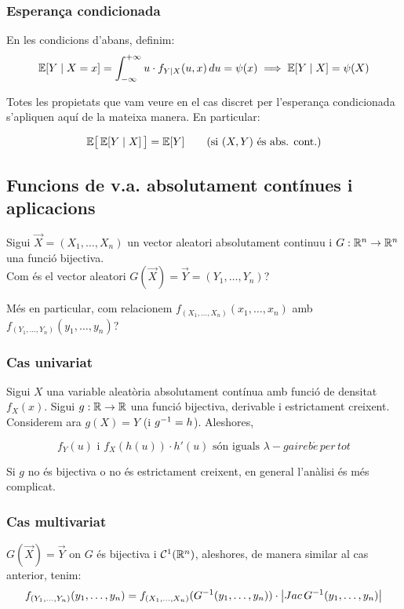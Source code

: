 \subsubsection{Esperança condicionada}

En les condicions d'abans, definim:
\[
  \mathbb{E}[Y\mid X=x] = \int_{-\infty}^{+\infty}u\cdot f_{Y\mid X}(u,x)\, du = \psi(x) \implies \mathbb{E}[Y\mid X] = \psi(X)
\]

Totes les propietats que vam veure en el cas discret per l'esperança condicionada s'apliquen aquí de la 
mateixa manera. En particular:

\begin{prop}
  \[
    \mathbb{E}\big[\,\mathbb{E}[Y\mid X]\,\big] = \mathbb{E}[Y] \qquad \text{(si $(X,Y)$ és abs. cont.)}
  \]
\end{prop}

\subsection{Funcions de v.a. absolutament contínues i aplicacions}

Sigui $\overrightarrow{X} = (X_{1}, \ldots , X_{n})$ un vector aleatori absolutament 
continuu i $G:\mathbb{R}^{n} \to \mathbb{R}^{n}$ una funció bijectiva. \\
Com és el vector aleatori $G(\overrightarrow{X}) = \overrightarrow{Y} = (Y_1, \ldots, Y_n)$?

Més en particular, com relacionem $f_{(X_{1},\ldots, X_{n})}(x_{1},\ldots,x_{n})$ amb $f_{(Y_{1},\ldots, Y_{n})}(y_{1},\ldots,y_{n})$?

\subsubsection{Cas univariat}
Sigui $X$ una variable aleatòria absolutament contínua amb funció de densitat $f_{X}(x)$. Sigui $g:\mathbb{R} \to \mathbb{R}$ 
una funció bijectiva, derivable i estrictament creixent. Considerem ara $g(X) = Y$ (i $g^{-1} = h$). Aleshores,

\[f_{Y}(u) \text{ i } f_{X}(h(u))\cdot h'(u) \text{ són iguals } \lambda-gaireb\acute{e} \, per \, tot\]

\begin{obs}
  Si $g$ no és bijectiva o no és estrictament creixent, en general l'anàlisi és més complicat.
\end{obs}

\subsubsection{Cas multivariat}
$G(\overrightarrow{X}) = \overrightarrow{Y}$ on $G$ és bijectiva i $\mathcal{C}^{1}(\mathbb{R}^{n})$, aleshores, 
de manera similar al cas anterior, tenim:
\[
  f_{(Y_{1},\ldots,Y_{n})}(y_{1},\ldots,y_{n}) = f_{(X_{1},\ldots,X_{n})}(G^{-1}(y_{1},\ldots,y_{n}))\cdot 
  \left\vert Jac\,G^{-1}(y_{1},\ldots,y_{n}) \right\vert
\]

